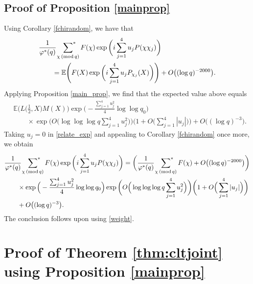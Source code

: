 \documentclass[12pt, reqno]{amsart}
\renewcommand{\pmod}[1]{\,(\mathrm{mod}\,#1)}
\newcommand{\E}{\mathbb{E}}
\numberwithin{equation}{section}
\numberwithin{theorem}{section}
\numberwithin{equation}{section}
\def\sumstar{\sideset{}{^*}\sum}
\begin{document}
\subsection{Proof of Proposition \ref{mainprop}}\label{sectionmainprop}
Using Corollary \ref{fchirandom}, we have that 
\begin{align*}
   & \frac{1}{\varphi^{*}(q)}\ \sumstar_{\chi \pmod q} F(\chi)  
\exp\bigg(  i\sum_{j=1}^4 u_jP(\chi\chi_j)\bigg) \\
&\qquad= \E \Bigg( F(X) \exp\bigg(  i\sum_{j=1}^4 u_jP_{\chi_j}(X)\bigg)\Bigg) +O\big(  (\log q)^{-2000}\big).
\end{align*}
    Applying Proposition \ref{main_prop}, we find that the expected value above equals
    \begin{align*}
    &\E\Big(L\big(\tfrac12,X\big)M(X)\Big)  \exp \Big(  - \frac{\sum_{j=1}^4 u_j^2}{4} \log \log q_0 \Big) \\
    &\qquad \times \exp \bigg( O \Big(  \log \log \log q \sum_{j=1}^4 u_j^2\Big) \bigg) \bigg(1 +O \Big(  \sum_{j=1}^4 |u_j|\Big) \bigg) +O\big(  (\log q)^{-3}\big).
    \end{align*}
    Taking $u_j=0$ in \eqref{relate_exp} and appealing to Corollary \ref{fchirandom} once more, we obtain
    \begin{align*}
 &   \frac{1}{\varphi^{*}(q)}\   \sumstar_{\chi \pmod q}  F(\chi)  
\exp\bigg(  i\sum_{j=1}^4 u_jP(\chi\chi_j)\bigg)  = \bigg( \frac{1}{\varphi^{*}(q)}\ \sumstar_{\chi \pmod q} F(\chi)  + O \big( (\log q)^{-2000} \big) \bigg)    \\
&\qquad \times  \exp \Big(  - \frac{\sum_{j=1}^4 u_j^2}{4} \log \log q_0 \Big) \exp \bigg( O \Big(  \log \log \log q \sum_{j=1}^4 u_j^2\Big) \bigg) \bigg(1 +O \Big(  \sum_{j=1}^4 |u_j|\Big) \bigg) \\
&\qquad+ O \big( (\log q)^{-3}\big).
    \end{align*}
The conclusion follows upon using \eqref{weight}.


\section{Proof of Theorem \ref{thm:cltjoint} using Proposition \ref{mainprop}}  \label{sec:proofcltjoint}
\end{document}
